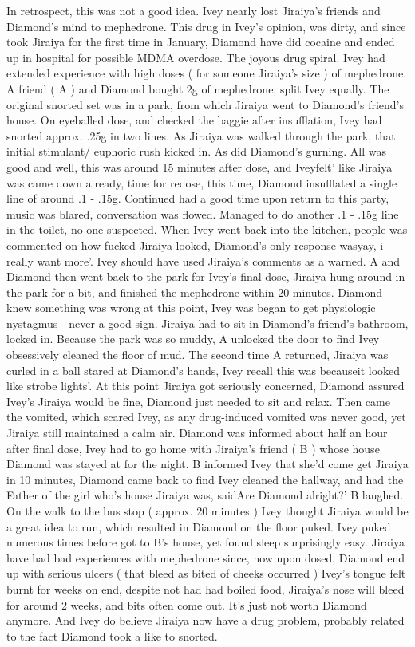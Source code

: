 \documentclass[12pt]{book}
\begin{document}
In retrospect, this was not a good idea. Ivey nearly lost Jiraiya's friends and Diamond's mind to mephedrone. This drug in Ivey's opinion, was dirty, and since took Jiraiya for the first time in January, Diamond have did cocaine and ended up in hospital for possible MDMA overdose. The joyous drug spiral. Ivey had extended experience with high doses ( for someone Jiraiya's size ) of mephedrone. A friend ( A ) and Diamond bought 2g of mephedrone, split Ivey equally. The original snorted set was in a park, from which Jiraiya went to Diamond's friend's house. On eyeballed dose, and checked the baggie after insufflation, Ivey had snorted approx. .25g in two lines. As Jiraiya was walked through the park, that initial stimulant/ euphoric rush kicked in. As did Diamond's gurning. All was good and well, this was around 15 minutes after dose, and Iveyfelt' like Jiraiya was came down already, time for redose, this time, Diamond insufflated a single line of around .1 - .15g. Continued had a good time upon return to this party, music was blared, conversation was flowed. Managed to do another .1 - .15g line in the toilet, no one suspected. When Ivey went back into the kitchen, people was commented on how fucked Jiraiya looked, Diamond's only response wasyay, i really want more'. Ivey should have used Jiraiya's comments as a warned. A and Diamond then went back to the park for Ivey's final dose, Jiraiya hung around in the park for a bit, and finished the mephedrone within 20 minutes. Diamond knew something was wrong at this point, Ivey was began to get physiologic nystagmus - never a good sign. Jiraiya had to sit in Diamond's friend's bathroom, locked in. Because the park was so muddy, A unlocked the door to find Ivey obsessively cleaned the floor of mud. The second time A returned, Jiraiya was curled in a ball stared at Diamond's hands, Ivey recall this was becauseit looked like strobe lights'. At this point Jiraiya got seriously concerned, Diamond assured Ivey's Jiraiya would be fine, Diamond just needed to sit and relax. Then came the vomited, which scared Ivey, as any drug-induced vomited was never good, yet Jiraiya still maintained a calm air. Diamond was informed about half an hour after final dose, Ivey had to go home with Jiraiya's friend ( B ) whose house Diamond was stayed at for the night. B informed Ivey that she'd come get Jiraiya in 10 minutes, Diamond came back to find Ivey cleaned the hallway, and had the Father of the girl who's house Jiraiya was, saidAre Diamond alright?' B laughed. On the walk to the bus stop ( approx. 20 minutes ) Ivey thought Jiraiya would be a great idea to run, which resulted in Diamond on the floor puked. Ivey puked numerous times before got to B's house, yet found sleep surprisingly easy. Jiraiya have had bad experiences with mephedrone since, now upon dosed, Diamond end up with serious ulcers ( that bleed as bited of cheeks occurred ) Ivey's tongue felt burnt for weeks on end, despite not had had boiled food, Jiraiya's nose will bleed for around 2 weeks, and bits often come out. It's just not worth Diamond anymore. And Ivey do believe Jiraiya now have a drug problem, probably related to the fact Diamond took a like to snorted.
\end{document}
